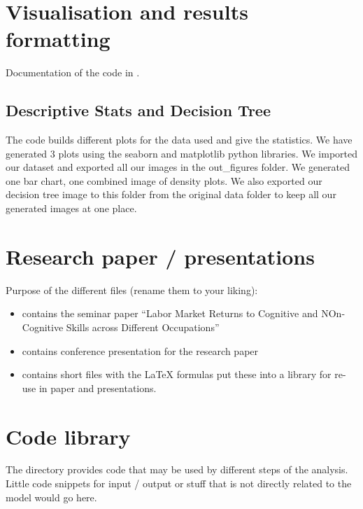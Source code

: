 \documentclass[a4paper,11pt,english]{sphinxmanual}
\begin{document}
\chapter{Visualisation and results formatting}
\label{\detokenize{final:visualisation-and-results-formatting}}\label{\detokenize{final:final}}\label{\detokenize{final::doc}}
Documentation of the code in .


\section{Descriptive Stats and Decision Tree}
\label{\detokenize{final:descriptive-stats-and-decision-tree}}\label{\detokenize{final:module-src.final.Descriptive}}
The code builds different plots for the data used and give the statistics. We have generated 3 plots using the seaborn and matplotlib python libraries.
We imported our dataset and exported all our images in the out\_figures folder.
We generated one bar chart, one combined image of density plots. We also exported our decision tree image to this folder from the original data folder to keep all our generated images at one place.


\chapter{Research paper / presentations}
\label{\detokenize{paper:research-paper-presentations}}\label{\detokenize{paper:paper}}\label{\detokenize{paper::doc}}
Purpose of the different files (rename them to your liking):
\begin{itemize}
\item {} 
 contains the seminar paper “Labor Market Returns to Cognitive and NOn-Cognitive Skills across Different Occupations”

\item {} 
 contains conference presentation for the research paper

\item {} 
 contains short files with the LaTeX formulas \textendash{} put these into a library for re-use in paper and presentations.

\end{itemize}


\chapter{Code library}
\label{\detokenize{library:code-library}}\label{\detokenize{library:library}}\label{\detokenize{library::doc}}
The directory  provides code that may be used by different steps of the analysis. Little code snippets for input / output or stuff that is not directly related to the model would go here.
\end{document}
